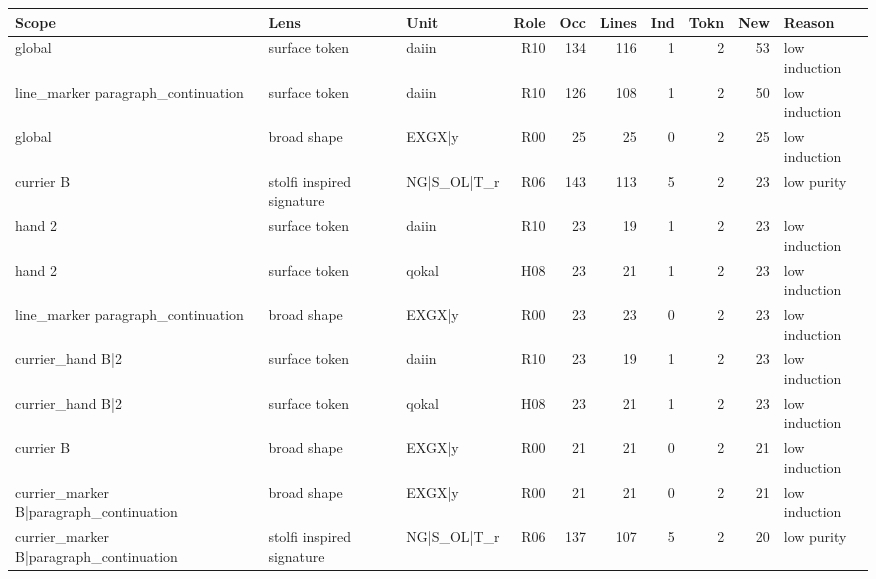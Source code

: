 \begin{tabular}{lllrrrrrrl}
\toprule
Scope & Lens & Unit & Role & Occ & Lines & Ind & Tokn & New & Reason \\
\midrule
global & surface token & daiin & R10 & 134 & 116 & 1 & 2 & 53 & low induction \\
line\_marker paragraph\_continuation & surface token & daiin & R10 & 126 & 108 & 1 & 2 & 50 & low induction \\
global & broad shape & EXGX|y & R00 & 25 & 25 & 0 & 2 & 25 & low induction \\
currier B & stolfi inspired signature & NG|S\_OL|T\_r & R06 & 143 & 113 & 5 & 2 & 23 & low purity \\
hand 2 & surface token & daiin & R10 & 23 & 19 & 1 & 2 & 23 & low induction \\
hand 2 & surface token & qokal & H08 & 23 & 21 & 1 & 2 & 23 & low induction \\
line\_marker paragraph\_continuation & broad shape & EXGX|y & R00 & 23 & 23 & 0 & 2 & 23 & low induction \\
currier\_hand B|2 & surface token & daiin & R10 & 23 & 19 & 1 & 2 & 23 & low induction \\
currier\_hand B|2 & surface token & qokal & H08 & 23 & 21 & 1 & 2 & 23 & low induction \\
currier B & broad shape & EXGX|y & R00 & 21 & 21 & 0 & 2 & 21 & low induction \\
currier\_marker B|paragraph\_continuation & broad shape & EXGX|y & R00 & 21 & 21 & 0 & 2 & 21 & low induction \\
currier\_marker B|paragraph\_continuation & stolfi inspired signature & NG|S\_OL|T\_r & R06 & 137 & 107 & 5 & 2 & 20 & low purity \\
\bottomrule
\end{tabular}